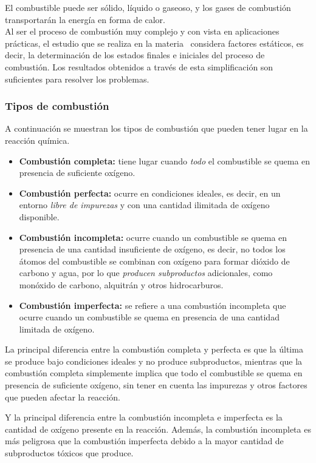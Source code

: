 El combustible puede ser sólido, líquido o gaseoso, y los gases de combustión transportarán la energía en forma de calor.\\

Al ser el proceso de combustión muy complejo y con vista en aplicaciones prácticas, el estudio que se realiza en la materia \materia\ considera factores estáticos, es decir, la determinación de los estados finales e iniciales del proceso de combustión. Los resultados obtenidos a través de esta simplificación son suficientes para resolver los problemas.

\subsubsection{Tipos de combustión}

A continuación se muestran los tipos de combustión que pueden tener lugar en la reacción química.

\begin{itemize}
	\item \textbf{Combustión completa:} tiene lugar cuando \textsl{todo} el combustible se quema en presencia de suficiente oxígeno.
	\item \textbf{Combustión perfecta:} ocurre en condiciones ideales, es decir, en un entorno \textsl{libre de impurezas} y con una cantidad ilimitada de oxígeno disponible.
	\item \textbf{Combustión incompleta:} ocurre cuando un combustible se quema en presencia de una cantidad insuficiente de oxígeno, es decir, no todos los átomos del combustible se combinan con oxígeno para formar dióxido de carbono y agua, por lo que \textsl{producen subproductos} adicionales, como monóxido de carbono, alquitrán y otros hidrocarburos.
	\item \textbf{Combustión imperfecta:} se refiere a una combustión incompleta que ocurre cuando un combustible se quema en presencia de una cantidad limitada de oxígeno.
\end{itemize}


La principal diferencia entre la combustión completa y perfecta es que la última se produce bajo condiciones ideales y no produce subproductos, mientras que la combustión completa simplemente implica que todo el combustible se quema en presencia de suficiente oxígeno, sin tener en cuenta las impurezas y otros factores que pueden afectar la reacción.


Y la principal diferencia entre la combustión incompleta e imperfecta es la cantidad de oxígeno presente en la reacción. Además, la combustión incompleta es más peligrosa que la combustión imperfecta debido a la mayor cantidad de subproductos tóxicos que produce.

